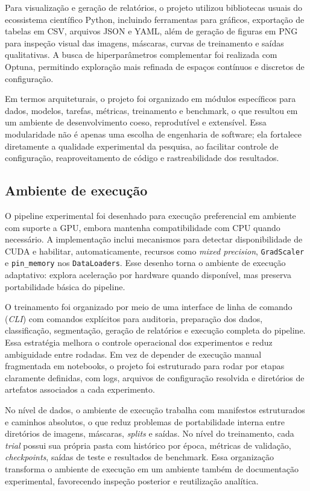\documentclass[tcc,capa]{texufpel}
\begin{document}
Para visualização e geração de relatórios, o projeto utilizou bibliotecas usuais do ecossistema científico Python, incluindo ferramentas para gráficos, exportação de tabelas em CSV, arquivos JSON e YAML, além de geração de figuras em PNG para inspeção visual das imagens, máscaras, curvas de treinamento e saídas qualitativas. A busca de hiperparâmetros complementar foi realizada com Optuna, permitindo exploração mais refinada de espaços contínuos e discretos de configuração.

Em termos arquiteturais, o projeto foi organizado em módulos específicos para dados, modelos, tarefas, métricas, treinamento e benchmark, o que resultou em um ambiente de desenvolvimento coeso, reprodutível e extensível. Essa modularidade não é apenas uma escolha de engenharia de software; ela fortalece diretamente a qualidade experimental da pesquisa, ao facilitar controle de configuração, reaproveitamento de código e rastreabilidade dos resultados.

\subsection{Ambiente de execução}

O pipeline experimental foi desenhado para execução preferencial em ambiente com suporte a GPU, embora mantenha compatibilidade com CPU quando necessário. A implementação inclui mecanismos para detectar disponibilidade de CUDA e habilitar, automaticamente, recursos como \textit{mixed precision}, \texttt{GradScaler} e \texttt{pin\_memory} nos \texttt{DataLoaders}. Esse desenho torna o ambiente de execução adaptativo: explora aceleração por hardware quando disponível, mas preserva portabilidade básica do pipeline.

O treinamento foi organizado por meio de uma interface de linha de comando (\textit{CLI}) com comandos explícitos para auditoria, preparação dos dados, classificação, segmentação, geração de relatórios e execução completa do pipeline. Essa estratégia melhora o controle operacional dos experimentos e reduz ambiguidade entre rodadas. Em vez de depender de execução manual fragmentada em notebooks, o projeto foi estruturado para rodar por etapas claramente definidas, com logs, arquivos de configuração resolvida e diretórios de artefatos associados a cada experimento.

No nível de dados, o ambiente de execução trabalha com manifestos estruturados e caminhos absolutos, o que reduz problemas de portabilidade interna entre diretórios de imagens, máscaras, \textit{splits} e saídas. No nível do treinamento, cada \textit{trial} possui sua própria pasta com histórico por época, métricas de validação, \textit{checkpoints}, saídas de teste e resultados de benchmark. Essa organização transforma o ambiente de execução em um ambiente também de documentação experimental, favorecendo inspeção posterior e reutilização analítica.
\end{document}
